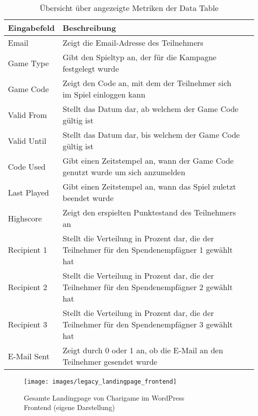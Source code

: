 \documentclass[
	ngerman,
	BCOR=8mm,
	headings=normal,
	parskip=half,
	headsepline,
	automark,
	listof=totoc,
	bibliography=totoc,
]{scrreprt}
\begin{document}
\begin{table}[h]
    \centering
    \renewcommand{\arraystretch}{1.3}
    \begin{tabular}{|p{3cm}|p{6cm}|p{5cm}|}
        \hline
        \textbf{Eingabefeld} & \textbf{Beschreibung}  \\
        \hline
        Email & Zeigt die Email-Adresse des Teilnehmers \\
        \hline
        Game Type & Gibt den Spieltyp an, der für die Kampagne festgelegt wurde \\
        \hline
        Game Code & Zeigt den Code an, mit dem der Teilnehmer sich im Spiel einloggen kann \\
        \hline
        Valid From & Stellt das Datum dar, ab welchem der Game Code gültig ist \\
        \hline
        Valid Until & Stellt das Datum dar, bis welchem der Game Code gültig ist  \\
        \hline
        Code Used & Gibt einen Zeitstempel an, wann der Game Code genutzt wurde um sich anzumelden \\
        \hline
        Last Played & Gibt einen Zeitstempel an, wann das Spiel zuletzt beendet wurde  \\
        \hline
        Highscore & Zeigt den erspielten Punktestand des Teilnehmers an \\
        \hline
        Recipient 1 & Stellt die Verteilung in Prozent dar, die der Teilnehmer für den Spendenempfägner 1 gewählt hat \\
        \hline
        Recipient 2 & Stellt die Verteilung in Prozent dar, die der Teilnehmer für den Spendenempfägner 2 gewählt hat \\
        \hline
        Recipient 3 & Stellt die Verteilung in Prozent dar, die der Teilnehmer für den Spendenempfägner 3 gewählt hat \\
        \hline
        E-Mail Sent & Zeigt durch 0 oder 1 an, ob die E-Mail an den Teilnehmer gesendet wurde  \\
        \hline

    \end{tabular}
    \caption{Übersicht über angezeigte Metriken der Data Table}
    \label{tab:metriken_datatable}
\end{table}
\begin{figure}[H]
    \centering
    \texttt{[image: images/legacy\_landingpage\_frontend]}
    \caption{Gesamte Landingpage von Charigame im WordPress \\Frontend  (eigene Darstellung)}
    \label{fig:landing-frontend-legacy}
\end{figure}
\end{document}
